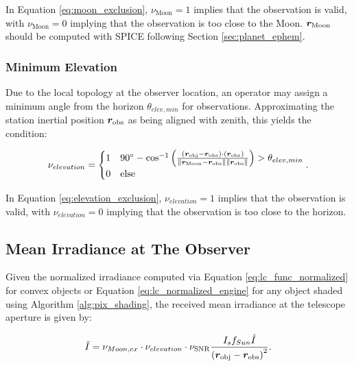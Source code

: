 In Equation \ref{eq:moon_exclusion}, $\nu_\mathrm{Moon} = 1$ implies that the observation is valid, with $\nu_\mathrm{Moon} = 0$ implying that the observation is too close to the Moon. $\bm{r}_\mathrm{Moon}$ should be computed with SPICE following Section \ref{sec:planet_ephem}.

\subsubsection{Minimum Elevation}

Due to the local topology at the observer location, an operator may assign a minimum angle from the horizon $\theta_{elev,min}$ for observations. Approximating the station inertial position $\bm{r}_\mathrm{obs}$ as being aligned with zenith, this yields the condition:


\begin{equation} \label{eq:elevation_exclusion}
  \nu_{elevation} = \begin{cases}
    1 & 90^\circ - \cos^{-1}\left( \frac{\left( \bm{r}_\mathrm{obj} - \bm{r}_\mathrm{obs} \right) \cdot \left( \bm{r}_\mathrm{obs} \right)}{\| \bm{r}_\mathrm{Moon} - \bm{r}_\mathrm{obs} \| \| \bm{r}_\mathrm{obs} \|} \right) > \theta_{elev,min}\\
    0 & \mathrm{else}
  \end{cases}.
\end{equation}

In Equation \ref{eq:elevation_exclusion}, $\nu_{elevation} = 1$ implies that the observation is valid, with $\nu_{elevation} = 0$ implying that the observation is too close to the horizon.

\subsection{Mean Irradiance at The Observer}

Given the normalized irradiance computed via Equation \ref{eq:lc_func_normalized} for convex objects or Equation \ref{eq:lc_normalized_engine} for any object shaded using Algorithm \ref{alg:pix_shading}, the received mean irradiance at the telescope aperture is given by:

\begin{equation} \label{eq:mean_irrad_at_aperture}
  \bar{I} = \nu_{Moon,ex} \cdot \nu_{elevation} \cdot \nu_{\mathrm{SNR}} \frac{I_s f_{Sun} \check{I}}{\left( \bm{r}_\mathrm{obj} - \bm{r}_\mathrm{obs} \right)^2}.
\end{equation}

